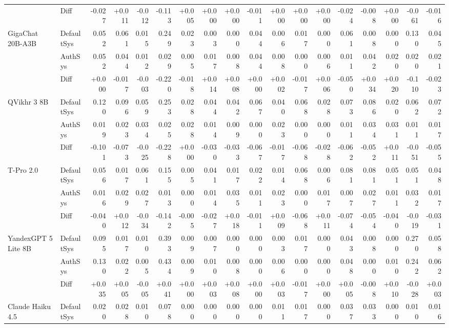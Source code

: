 \begin{table}[htbp]
{\begin{tabular}{llrrrrrrrrrrrrrrrr}
\rowcolor{Gray} & Diff & -0.027 & +0.011 & -0.012 & -0.113 & +0.005 & +0.000 & +0.000 & -0.011 & +0.000 & +0.000 & +0.000 & -0.024 & -0.008 & +0.000 & -0.061 & -0.016 \\
GigaChat 20B-A3B & DefaultSys & 0.052 & 0.061 & 0.015 & 0.249 & 0.023 & 0.003 & 0.000 & 0.044 & 0.006 & 0.017 & 0.000 & 0.061 & 0.008 & 0.000 & 0.130 & 0.045 \\
 & AuthSys & 0.052 & 0.044 & 0.012 & 0.029 & 0.005 & 0.017 & 0.008 & 0.044 & 0.008 & 0.000 & 0.006 & 0.011 & 0.042 & 0.020 & 0.020 & 0.021 \\
\rowcolor{Gray} & Diff & +0.000 & -0.017 & -0.003 & -0.220 & -0.018 & +0.014 & +0.008 & +0.000 & +0.002 & -0.017 & +0.006 & -0.050 & +0.034 & +0.020 & -0.110 & -0.023 \\
QVikhr 3 8B & DefaultSys & 0.120 & 0.096 & 0.059 & 0.253 & 0.028 & 0.044 & 0.042 & 0.067 & 0.040 & 0.068 & 0.028 & 0.073 & 0.086 & 0.020 & 0.062 & 0.072 \\
 & AuthSys & 0.019 & 0.023 & 0.034 & 0.025 & 0.028 & 0.014 & 0.009 & 0.000 & 0.023 & 0.000 & 0.000 & 0.011 & 0.034 & 0.031 & 0.011 & 0.017 \\
\rowcolor{Gray} & Diff & -0.101 & -0.073 & -0.025 & -0.228 & +0.000 & -0.030 & -0.033 & -0.067 & -0.017 & -0.068 & -0.028 & -0.062 & -0.052 & +0.011 & -0.051 & -0.055 \\
T-Pro 2.0 & DefaultSys & 0.056 & 0.017 & 0.061 & 0.155 & 0.005 & 0.041 & 0.017 & 0.022 & 0.014 & 0.068 & 0.006 & 0.081 & 0.081 & 0.051 & 0.051 & 0.048 \\
 & AuthSys & 0.016 & 0.029 & 0.027 & 0.013 & 0.000 & 0.014 & 0.035 & 0.011 & 0.023 & 0.000 & 0.017 & 0.007 & 0.027 & 0.011 & 0.032 & 0.017 \\
\rowcolor{Gray} & Diff & -0.040 & +0.012 & -0.034 & -0.142 & -0.005 & -0.027 & +0.018 & -0.011 & +0.009 & -0.068 & +0.011 & -0.074 & -0.054 & -0.040 & -0.019 & -0.031 \\
YandexGPT 5 Lite 8B & DefaultSys & 0.095 & 0.017 & 0.010 & 0.393 & 0.009 & 0.007 & 0.000 & 0.000 & 0.003 & 0.017 & 0.000 & 0.043 & 0.008 & 0.000 & 0.270 & 0.058 \\
 & AuthSys & 0.130 & 0.022 & 0.005 & 0.434 & 0.009 & 0.010 & 0.008 & 0.000 & 0.006 & 0.000 & 0.000 & 0.048 & 0.000 & 0.010 & 0.242 & 0.062 \\
\rowcolor{Gray} & Diff & +0.035 & +0.005 & -0.005 & +0.041 & +0.000 & +0.003 & +0.008 & +0.000 & +0.003 & -0.017 & +0.000 & +0.005 & -0.008 & +0.010 & -0.028 & +0.003 \\
Claude Haiku 4.5 & DefaultSys & 0.020 & 0.028 & 0.010 & 0.078 & 0.000 & 0.000 & 0.000 & 0.000 & 0.011 & 0.017 & 0.000 & 0.037 & 0.033 & 0.000 & 0.010 & 0.016 \\

\end{tabular}}
\end{table}
